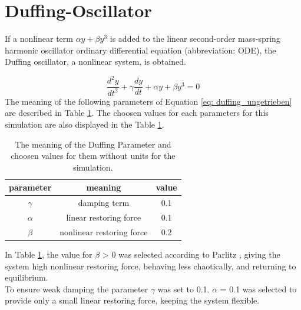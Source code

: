 \documentclass[oneside,10pt,a4paper]{report}
\begin{document}
		\section{Duffing-Oscillator}
		If a nonlinear term $\alpha y + \beta y^3$ is added to the linear second-order mass-spring harmonic oscillator ordinary differential equation (abbreviation: ODE), the Duffing oscillator\cite{twist_paper}, a nonlinear system, is obtained.
		
		\begin{equation}\label{eq: duffing_ungetrieben}
			\frac{d^2y}{dt^2} + \gamma \frac{dy}{dt} + \alpha y + \beta y^3 = 0
		\end{equation}
		The meaning of the following parameters of Equation \ref{eq: duffing_ungetrieben} are described in Table \ref{tab: duffing_ungetriebene_parameter}. The choosen values for each parameters for this simulation are also displayed in the Table \ref{tab: duffing_ungetriebene_parameter}.
		
			\begin{table}[H]
			\centering
			\caption{The meaning of the Duffing Parameter and choosen values for them without units for the simulation.}
			\label{tab: duffing_ungetriebene_parameter}
			\begin{tabular}{c c c}
				\toprule
				parameter & meaning & value\\
				\midrule
				$\gamma$ & damping term & 0.1\\
				$\alpha$ & linear restoring force & 0.1\\
				$\beta$& nonlinear restoring force & 0.2\cite{Parlitz_p93}\\
				\bottomrule
			\end{tabular}
		\end{table}
		
		In Table \ref{tab: duffing_ungetriebene_parameter}, the value for $\beta$ > 0 was selected according to Parlitz \cite{Parlitz_p93}, giving the system high nonlinear restoring force, behaving less chaotically, and returning to equilibrium. \\
		To ensure weak damping the parameter $\gamma$ was set to 0.1. $\alpha$ = 0.1 was selected to provide only a small linear restoring force, keeping the system flexible.
		
\end{document}
